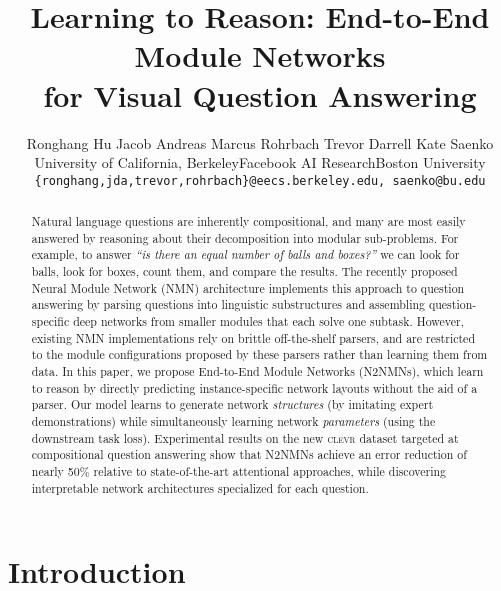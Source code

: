 \documentclass[10pt,twocolumn,letterpaper]{article}
\newcommand{\clevr}{\textsc{clevr}\xspace}
\begin{document}
\title{Learning to Reason: End-to-End Module Networks \\ for Visual Question Answering}

\author{Ronghang Hu \quad Jacob Andreas \quad Marcus Rohrbach \quad Trevor Darrell \quad Kate Saenko \\
University of California, BerkeleyFacebook AI ResearchBoston University \\
{\tt\small \{ronghang,jda,trevor,rohrbach\}@eecs.berkeley.edu, saenko@bu.edu}}

\maketitle
\thispagestyle{empty}


\begin{abstract} 
Natural language questions are inherently compositional, and many are most easily answered by reasoning about 
their decomposition into modular sub-problems. For example, to answer \emph{``is there an equal number of balls 
and boxes?''} we can look for balls, look for boxes, count them, and compare the results. The recently proposed 
Neural Module Network (NMN) architecture \cite{andreas16neural,andreas2016learning} implements this approach to question answering by parsing questions into linguistic substructures and assembling question-specific deep networks from smaller modules that each solve one subtask. However, existing NMN implementations rely on brittle off-the-shelf parsers, and are restricted to the module configurations proposed by these parsers rather than learning them from data. In this paper, we propose End-to-End Module Networks (N2NMNs), which learn to reason by directly predicting instance-specific network layouts without the aid of a parser. Our model learns to generate network \emph{structures} (by imitating expert demonstrations) while simultaneously learning network \emph{parameters} (using the downstream task loss). Experimental results on the new \clevr dataset targeted at compositional question answering show that N2NMNs achieve an error reduction of nearly 50\% relative to state-of-the-art attentional approaches, while discovering interpretable network architectures specialized for each question.
\end{abstract}

\section{Introduction}
\end{document}
